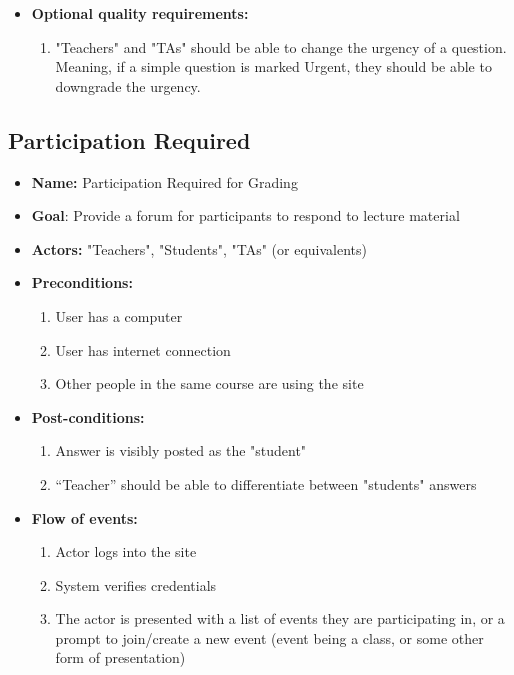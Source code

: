 \documentclass[12pt]{article}
\begin{document}
\begin{itemize}
\begin{enumerate}
        \end{enumerate}
    \item \textbf{Optional quality requirements:}
        \begin{enumerate}
            \item "Teachers" and "TAs" should be able to change the urgency of a question. Meaning, if a simple question is marked Urgent, they should be able to downgrade the urgency.
        \end{enumerate}
\end{itemize}

\subsection{Participation Required}
\begin{itemize}
    \item \textbf{Name:} Participation Required for Grading
    \item \textbf{Goal}: Provide a forum for participants to respond to lecture material
    \item \textbf{Actors:} "Teachers", "Students", "TAs" (or equivalents)
    \item \textbf{Preconditions:} 
        \begin{enumerate}
            \item User has a computer
            \item User has internet connection
            \item Other people in the same course are using the site
        \end{enumerate}
    \item \textbf{Post-conditions:} 
        \begin{enumerate}
            \item Answer is visibly posted as the "student" 
            \item “Teacher” should be able to differentiate between "students" answers
        \end{enumerate}
    \item \textbf{Flow of events:} 
        \begin{enumerate}
            \item Actor logs into the site
            \item System verifies credentials
            \item The actor is presented with a list of events they are participating in, or a prompt to join/create a new event (event being a class, or some other form of presentation)

\end{enumerate}
\end{itemize}
\end{document}
